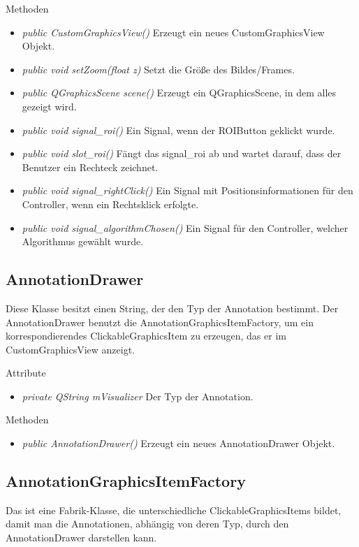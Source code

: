 Methoden
\begin{itemize}
	\item\textit{public CustomGraphicsView()} 
	Erzeugt ein neues CustomGraphicsView Objekt.
	\item\textit{public void setZoom(float z)} Setzt die Größe des Bildes/Frames.
	\item\textit{public QGraphicsScene scene()} Erzeugt ein QGraphicsScene, in dem alles gezeigt wird.
	\item\textit{public void signal\_roi()} Ein Signal, wenn der ROIButton geklickt wurde.
	\item\textit{public void slot\_roi()} Fängt das signal\_roi ab und wartet darauf, dass der Benutzer ein Rechteck zeichnet.
	\item\textit{public void signal\_rightClick()} Ein Signal mit Positionsinformationen für den Controller, wenn ein Rechtsklick erfolgte. 
	\item\textit{public void signal\_algorithmChosen()} Ein Signal für den Controller, welcher Algorithmus gewählt wurde.
\end{itemize}

\subsection*{AnnotationDrawer}
Diese Klasse besitzt einen String, der den Typ der Annotation bestimmt. Der AnnotationDrawer benutzt die AnnotationGraphicsItemFactory, um ein korrespondierendes ClickableGraphicsItem zu erzeugen, das er im CustomGraphicsView anzeigt.

Attribute
\begin{itemize}
	\item\textit{private QString mVisualizer} Der Typ der Annotation.   
\end{itemize}

Methoden
\begin{itemize}
	\item\textit{public AnnotationDrawer()} Erzeugt ein neues AnnotationDrawer Objekt.
\end{itemize}
  
\subsection*{AnnotationGraphicsItemFactory}
Das ist eine Fabrik-Klasse, die unterschiedliche ClickableGraphicsItems bildet, damit man die Annotationen, abhängig von deren Typ, durch den AnnotationDrawer darstellen kann.


